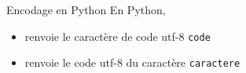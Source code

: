 \documentclass[10pt]{beamer}
\begin{document}
\begin{frame}
	\mframe{\Encodage}
	\begin{block}{Encodage en Python}
		En Python, 
		\begin{itemize}
			\item<2->  renvoie le caractère de code {\sc utf-8} {\tt code}
			\item<3->   renvoie le code  {\sc utf-8} du caractère {\tt caractere}
		 \end{itemize}
	\end{block}
\end{frame}
\end{document}
